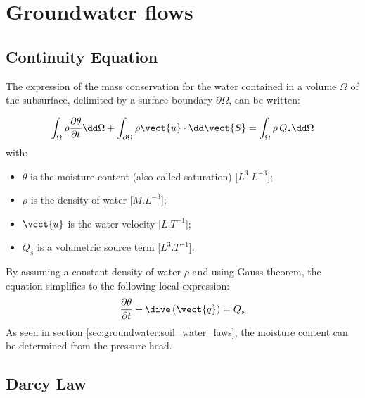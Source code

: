 \section{Groundwater flows}

\subsection{Continuity Equation}

The expression of the mass conservation for the water contained in a volume $\Omega$ of
the subsurface, delimited by a surface boundary $\partial \Omega$,
can be written:

\begin{equation}\label{eq:groundwater:int_mass_cons}
\int_\Omega{\rho \frac{\partial{\theta}}{\partial{t}} \dd \Omega} + \int_{\partial \Omega}{ \rho \vect{u}\cdot  \dd \vect{S}}=
\int_\Omega{\rho\,Q_s \dd \Omega}
\end{equation}
with:
\begin {itemize}
 \item[$\bullet$] $\theta$ is the moisture content (also called saturation) [$L^3.L^{-3}$];
 \item[$\bullet$] $\rho$ is the density of water [$M.L^{-3}$];
 \item[$\bullet$] $\vect{u}$ is the water velocity [$L.T^{-1}$];
 \item[$\bullet$] $Q_s$ is a volumetric source term [$L^3.T^{-1}$].
\end{itemize}

By assuming a constant density of water $\rho$ and using Gauss theorem, the equation simplifies to the following local expression:
\begin{equation}\label{eq:groundwater:mass_cons}
\frac{\partial{\theta}}{\partial{t}} + \dive \left( \vect{q} \right) = Q_s
\end{equation}
As seen in section \ref{sec:groundwater:soil_water_laws}, the moisture content can be determined from the pressure head.

\subsection{Darcy Law}\label{sec:groundwater:darcy_law}

